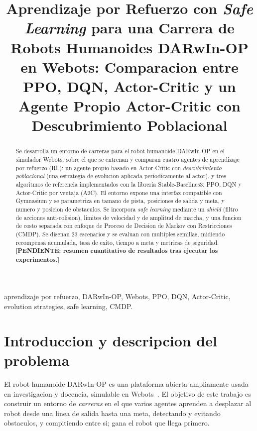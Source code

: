 \documentclass[conference]{IEEEtran}
\begin{document}
\title{Aprendizaje por Refuerzo con \emph{Safe Learning} para una Carrera de
Robots Humanoides DARwIn-OP en Webots: Comparacion entre PPO, DQN,
Actor-Critic y un Agente Propio Actor-Critic con Descubrimiento Poblacional}

\author{
}

\maketitle

\begin{abstract}
Se desarrolla un entorno de carreras para el robot humanoide DARwIn-OP en el
simulador Webots, sobre el que se entrenan y comparan cuatro agentes de
aprendizaje por refuerzo (RL): un agente propio basado en Actor-Critic con
\emph{descubrimiento poblacional} (una estrategia de evolucion aplicada
periodicamente al actor), y tres algoritmos de referencia implementados con la
libreria Stable-Baselines3: PPO, DQN y Actor-Critic por ventaja (A2C). El
entorno expone una interfaz compatible con Gymnasium y se parametriza en tamano
de pista, posiciones de salida y meta, y numero y posicion de obstaculos. Se
incorpora \emph{safe learning} mediante un \emph{shield} (filtro de acciones
anti-colision), limites de velocidad y de amplitud de marcha, y una funcion de
costo separada con enfoque de Proceso de Decision de Markov con Restricciones
(CMDP). Se disenan 23 escenarios y se evaluan con multiples semillas, midiendo
recompensa acumulada, tasa de exito, tiempo a meta y metricas de seguridad.
\textbf{[PENDIENTE: resumen cuantitativo de resultados tras ejecutar los
experimentos.]}
\end{abstract}

\begin{IEEEkeywords}
aprendizaje por refuerzo, DARwIn-OP, Webots, PPO, DQN, Actor-Critic, evolution
strategies, safe learning, CMDP.
\end{IEEEkeywords}

\section{Introduccion y descripcion del problema}
El robot humanoide DARwIn-OP es una plataforma abierta ampliamente usada en
investigacion y docencia, simulable en Webots~\cite{webots}. El objetivo de este
trabajo es construir un entorno de \emph{carreras} en el que varios agentes
aprenden a desplazar al robot desde una linea de salida hasta una meta,
detectando y evitando obstaculos, y compitiendo entre si; gana el robot que
llega primero.
\end{document}

